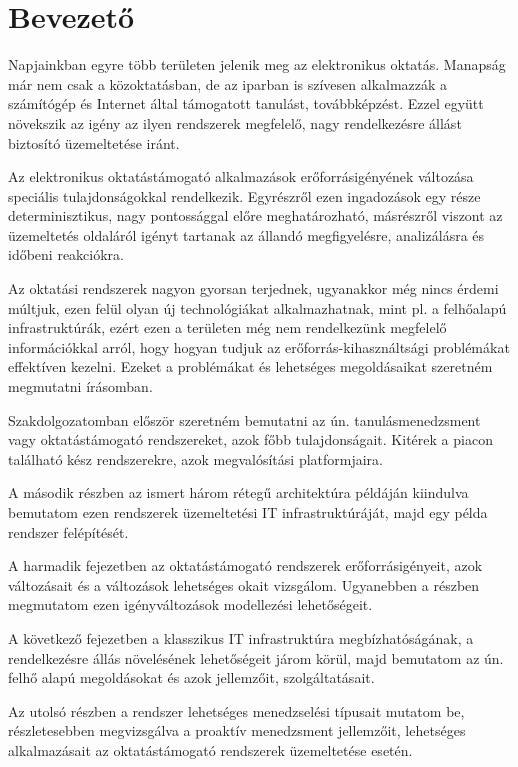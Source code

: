 \chapter*{Bevezető}

Napjainkban egyre több területen jelenik meg az elektronikus oktatás. Manapság már nem csak a közoktatásban, de az iparban is szívesen alkalmazzák a számítógép és Internet által támogatott tanulást, továbbképzést. Ezzel együtt növekszik az igény az ilyen rendszerek megfelelő, nagy rendelkezésre állást biztosító üzemeltetése iránt.

Az elektronikus oktatástámogató alkalmazások erőforrásigényének változása speciális tulajdonságokkal rendelkezik. Egyrészről ezen ingadozások egy része determinisztikus, nagy pontossággal előre meghatározható, másrészről viszont az üzemeltetés oldaláról igényt tartanak az állandó megfigyelésre, analizálásra és időbeni reakciókra.

Az oktatási rendszerek nagyon gyorsan terjednek, ugyanakkor még nincs érdemi múltjuk, ezen felül olyan új technológiákat alkalmazhatnak, mint pl. a felhőalapú infrastruktúrák, ezért ezen a területen még nem rendelkezünk megfelelő információkkal arról, hogy hogyan tudjuk az erőforrás-kihasználtsági problémákat effektíven kezelni. Ezeket a problémákat és lehetséges megoldásaikat szeretném megmutatni írásomban.

Szakdolgozatomban először szeretném bemutatni az ún. tanulásmenedzsment vagy oktatástámogató rendszereket, azok főbb tulajdonságait. Kitérek a piacon található kész rendszerekre, azok megvalósítási platformjaira.

A második részben az ismert három rétegű architektúra példáján kiindulva bemutatom ezen rendszerek üzemeltetési IT infrastruktúráját, majd egy példa rendszer felépítését.

A harmadik fejezetben az oktatástámogató rendszerek erőforrásigényeit, azok változásait és a változások lehetséges okait vizsgálom. Ugyanebben a részben megmutatom ezen igényváltozások modellezési lehetőségeit.

A következő fejezetben a klasszikus IT infrastruktúra megbízhatóságának, a rendelkezésre állás növelésének lehetőségeit járom körül, majd bemutatom az ún. felhő alapú megoldásokat és azok jellemzőit, szolgáltatásait.

Az utolsó részben a rendszer lehetséges menedzselési típusait mutatom be, részletesebben megvizsgálva a proaktív menedzsment jellemzőit, lehetséges alkalmazásait az oktatástámogató rendszerek üzemeltetése esetén.
 